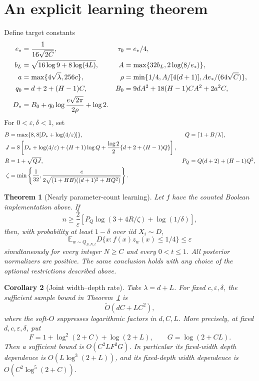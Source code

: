 \documentclass[11pt]{article}
\newtheorem{theorem}{Theorem}
\newtheorem{corollary}[theorem]{Corollary}
\newcommand{\E}{\mathbb E}
\begin{document}
\section{An explicit learning theorem}

Define target constants
\begin{align}
 e_*&=\frac1{16\sqrt{2C}},&\tau_0&=e_*/4,\notag\\
 b_L&=\sqrt{16\log9+8\log(4L)},&
 A&=\max\{32b_L,2\log(8/e_*)\},\notag\\
 a&=\max\{4\sqrt\lambda,256c\},&
 \rho&=\min\{1/4,A/[4(d+1)],Ae_*/(64\sqrt C)\},\notag\\
 q_0&=d+2+(H-1)C,&
 B_0&=9dA^2+18(H-1)CA^2+2a^2C,\notag\\
 D_*&=B_0+q_0\log\frac{e\sqrt{2\pi}}{2\rho}+\log2.
 \label{eq:targetconstants}
\end{align}
For $0<\varepsilon,\delta<1$, set
\begin{align}
 B&=\max\{8,8[D_*+\log(4/\varepsilon)]\},&
 Q&=\lceil1+B/\lambda\rceil,\notag\\
 J&=8\left[D_*+\log(4/\varepsilon)+(H+1)\log Q
       +\frac{\log2}{2}\{d+2+(H-1)Q\}\right],\notag\\
 R&=1+\sqrt{QJ},&P_Q&=Q(d+2)+(H-1)Q^2,\notag\\
 \zeta&=\min\left\{\frac1{32},
 \frac{c}{2\sqrt{(1+HB)((d+1)^2+HQ^2)}}\right\}.
 \label{eq:budgets}
\end{align}

\begin{theorem}[Nearly parameter-count learning]\label{thm:main}
Let $f$ have the counted Boolean implementation above. If
\begin{equation}\label{eq:samples}
 n\ge\frac2\varepsilon\left[
 P_Q\log(3+4R/\zeta)+\log(1/\delta)\right],
\end{equation}
then, with probability at least $1-\delta$ over iid $X_i\sim D$,
\begin{equation}\label{eq:conclusion}
 \E_{w\sim Q_{S,N,t}}D\{x:f(x)z_w(x)\le1/4\}\le\varepsilon
\end{equation}
simultaneously for every integer $N\ge C$ and every $0<t\le1$.
All posterior normalizers are positive. The same conclusion holds with
any choice of the optional restrictions described above.
\end{theorem}

\begin{corollary}[Joint width--depth rate]\label{cor:rate}
Take $\lambda=d+L$. For fixed $c,\varepsilon,\delta$, the sufficient sample
bound in Theorem~\ref{thm:main} is
\[
 \widetilde O(dC+LC^2),
\]
where the soft-$O$ suppresses logarithmic factors in $d,C,L$.
More precisely, at fixed $d,c,\varepsilon,\delta$, put
\[
 F=1+\log^2(2+C)+\log(2+L),\qquad G=\log(2+CL).
\]
Then a sufficient bound is $O(C^2LF^2G)$. In particular its fixed-width
depth dependence is $O(L\log^3(2+L))$, and its fixed-depth width dependence
is $O(C^2\log^5(2+C))$.
\end{corollary}
\end{document}
